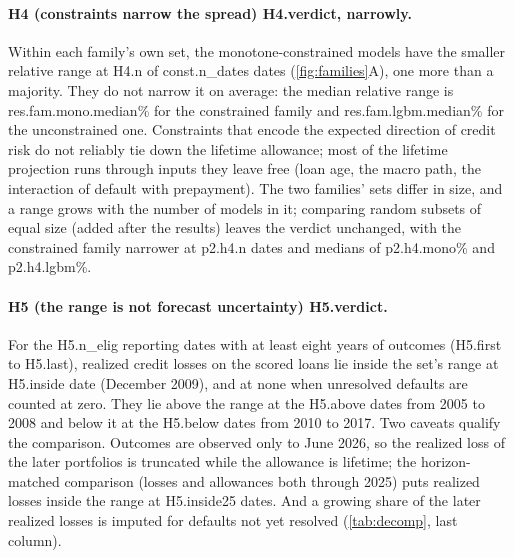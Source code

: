 \paragraph{H4 (constraints narrow the spread) \num{H4.verdict}, narrowly.}
Within each family's own set, the monotone-constrained models have the
smaller relative range at \num{H4.n} of \num{const.n_dates} dates
(\cref{fig:families}A), one more than a majority. They do not narrow it on
average: the median relative range is \num{res.fam.mono.median}\% for the
constrained family and \num{res.fam.lgbm.median}\% for the unconstrained one.
Constraints that encode the
expected direction of credit risk do not reliably tie down the lifetime
allowance; most of the lifetime projection runs through inputs they leave free
(loan age, the macro path, the interaction of default with prepayment).
The two families' sets differ in size, and a range grows with the number of
models in it; comparing random subsets of equal size (added after the
results) leaves the verdict unchanged, with the constrained family narrower at
\num{p2.h4.n} dates and medians of \num{p2.h4.mono}\% and \num{p2.h4.lgbm}\%.

\paragraph{H5 (the range is not forecast uncertainty) \num{H5.verdict}.} For the
\num{H5.n_elig} reporting dates with at least eight years of outcomes
(\num{H5.first} to \num{H5.last}), realized credit losses on the scored loans lie
inside the set's range at \num{H5.inside} date (December 2009), and at none when
unresolved defaults are counted at zero. They lie above the range at the
\num{H5.above} dates from 2005 to 2008 and below it at the \num{H5.below} dates
from 2010 to 2017. Two caveats qualify the comparison. Outcomes are observed
only to June 2026, so the realized loss of the later portfolios is truncated
while the allowance is lifetime; the horizon-matched comparison (losses and
allowances both through 2025) puts realized losses inside the range at
\num{H5.inside25} dates. And a growing share of the later realized losses is
imputed for defaults not yet resolved (\cref{tab:decomp}, last column).

